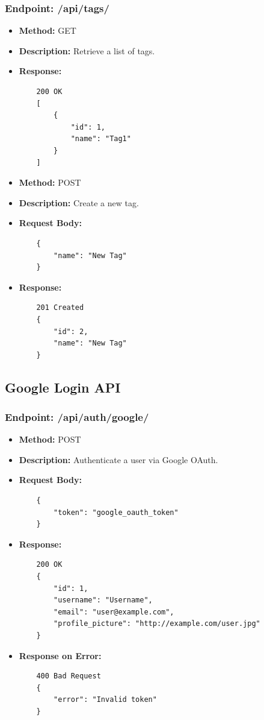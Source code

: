 \subsubsection{Endpoint: /api/tags/}
\begin{itemize}
    \item \textbf{Method:} GET
    \item \textbf{Description:} Retrieve a list of tags.
    \item \textbf{Response:}
    \begin{verbatim}
    200 OK
    [
        {
            "id": 1,
            "name": "Tag1"
        }
    ]
    \end{verbatim}
    \item \textbf{Method:} POST
    \item \textbf{Description:} Create a new tag.
    \item \textbf{Request Body:}
    \begin{verbatim}
    {
        "name": "New Tag"
    }
    \end{verbatim}
    \item \textbf{Response:}
    \begin{verbatim}
    201 Created
    {
        "id": 2,
        "name": "New Tag"
    }
    \end{verbatim}
\end{itemize}


\subsection{Google Login API}

\subsubsection{Endpoint: /api/auth/google/}
\begin{itemize}
    \item \textbf{Method:} POST
    \item \textbf{Description:} Authenticate a user via Google OAuth.
    \item \textbf{Request Body:}
    \begin{verbatim}
    {
        "token": "google_oauth_token"
    }
    \end{verbatim}
    \item \textbf{Response:}
    \begin{verbatim}
    200 OK
    {
        "id": 1,
        "username": "Username",
        "email": "user@example.com",
        "profile_picture": "http://example.com/user.jpg"
    }
    \end{verbatim}
    \item \textbf{Response on Error:}
    \begin{verbatim}
    400 Bad Request
    {
        "error": "Invalid token"
    }
    \end{verbatim}
\end{itemize}



